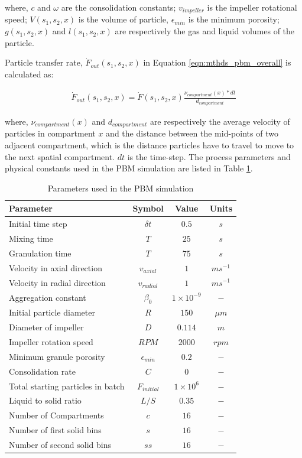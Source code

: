 \documentclass[preprint,11pt,authoryear]{elsarticle}
\begin{document}
 where, $c$ and $\omega$ are the consolidation constants; $v_{impeller}$ is the impeller 
rotational speed; $V(s_1,s_2,x)$ is the volume of particle, $\epsilon_{min}$ is the minimum porosity; 
$g(s_1,s_2,x)$ and $l(s_1,s_2,x)$ are respectively the gas and liquid volumes of the particle.

Particle transfer rate, $\dot{F}_{out}(s_1,s_2,x)$ in Equation \ref{eqn:mthds_pbm_overall} is calculated 
as:

\begin{align}
\dot{F}_{out}(s_1,s_2,x) = \dot{F}(s_1,s_2,x)\frac{\nu_{compartment}(x)*dt}{d_{compartment}}
\end{align}

where, $\nu_{compartment}(x)$ and $d_{compartment}$ are respectively the average velocity of 
particles in compartment $x$ and the distance between the mid-points of two adjacent compartment, 
which is the distance particles have to travel to move to the next spatial compartment. $dt$ is the 
time-step.
The process parameters and physical constants used in the PBM simulation are listed in Table 
\ref{table:mthds_pbm_parameters}.
\begin{table}
\caption{Parameters used in the PBM simulation}
\label{table:mthds_pbm_parameters}
\begin{center}
\begin{tabular}{l|c|c|c}
\hline
\bf{Parameter} &\bf{Symbol} &\bf{Value} &\bf{Units}\\
\hline
Initial time step & $\delta t$ & $0.5$ & $s$\\
Mixing time & $T$ & $25$ & $s$\\
Granulation time & $T$ & $75$ & $s$\\
Velocity in axial direction & $v_{axial}$ & $1$ & $ms^{-1}$\\
Velocity in radial direction & $v_{radial}$ & $1$ & $ms^{-1}$\\
Aggregation constant & $\beta_0$ & $1\times10^{-9}$ & $-$\\
Initial particle diameter & $R$ & $150$ & $\mu m$\\
Diameter of impeller & $D$ & $0.114$ & $m$ \\
Impeller rotation speed & $RPM$ & $2000$ & $rpm$\\
Minimum granule porosity & $\epsilon_{min}$ & $0.2$ & $-$\\
Consolidation rate & $C$ & $0$ & $-$\\
Total starting particles in batch & $F_{initial}$ & $1 \times 10^{6}$ & $-$\\
Liquid to solid ratio & $L/S$ & $0.35$ & $-$ \\
Number of Compartments & $c$ & $16$ & $-$ \\
Number of first solid bins & $s$ & $16$ & $-$\\
Number of second solid bins & $ss$ & $16$ & $-$\\
\hline
\end{tabular}
\end{center}
\end{table}
\end{document}
